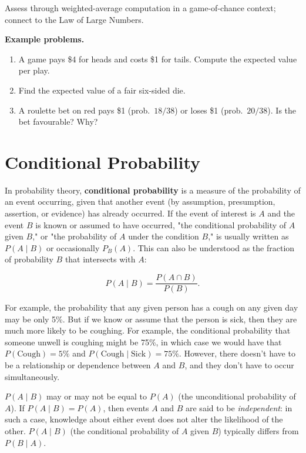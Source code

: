 Assess through weighted-average computation in a game-of-chance context;
connect to the Law of Large Numbers.

\textbf{Example problems.}
\begin{enumerate}
    \item A game pays \$4 for heads and costs \$1 for tails. Compute
          the expected value per play.
    \item Find the expected value of a fair six-sided die.
    \item A roulette bet on red pays \$1 (prob.\ $18/38$) or loses
          \$1 (prob.\ $20/38$). Is the bet favourable? Why?
\end{enumerate}



\section{Conditional Probability}
\label{sec:cond-bd32}


In probability theory, \textbf{conditional probability} is a measure of the probability of
an event occurring, given that another event (by assumption, presumption, assertion, or
evidence) has already occurred. If the event of interest is $A$ and the event $B$ is known
or assumed to have occurred, "the conditional probability of $A$ given $B$," or "the
probability of $A$ under the condition $B$," is usually written as $P(A \mid B)$ or
occasionally $P _{B}(A)$. This can also be understood as the fraction of probability $B$
that intersects with $A$:

$$P(A \mid B) = \frac{P(A \cap B)}{P(B)}.$$



For example, the probability that any given person has a cough on any given day may be
only 5\%. But if we know or assume that the person is sick, then they are much more likely
to be coughing. For example, the conditional probability that someone unwell is coughing
might be 75\%, in which case we would have that $P(\text{Cough}) = 5\%$ and
$P(\text{Cough} \mid \text{Sick}) = 75\%$. However, there doesn't have to be a
relationship or dependence between $A$ and $B$, and they don't have to occur
simultaneously.



$P(A \mid B)$ may or may not be equal to $P(A)$ (the unconditional probability of $A$). If
$P(A \mid B) = P(A)$, then events $A$ and $B$ are said to be \textit{independent}: in such
a case, knowledge about either event does not alter the likelihood of the other. $P(A \mid
B)$ (the conditional probability of $A$ given $B$) typically differs from $P(B \mid A)$.



